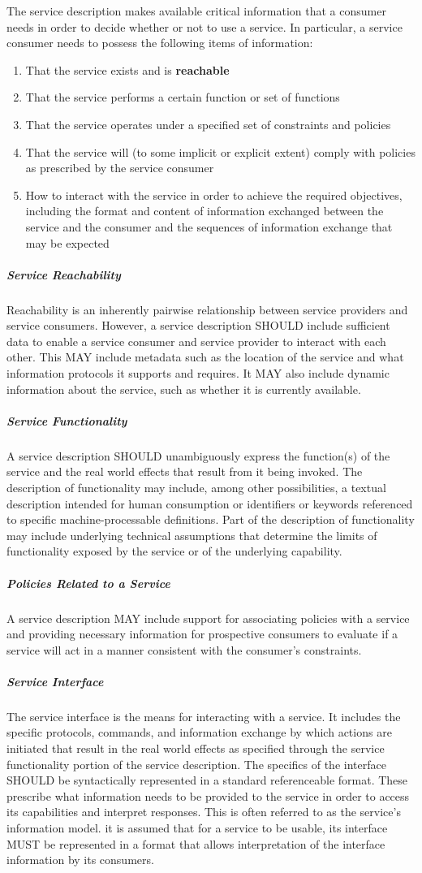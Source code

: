 \documentclass[10pt,a4paper]{article}
\begin{document}
The service description makes available critical information that a consumer needs in order to decide whether or not to use a service. In particular, a service consumer needs to possess the following items of information:
\begin{enumerate}
	\item That the service exists and is \textbf{reachable}
	\item That the service performs a certain function or set of functions
	\item That the service operates under a specified set of constraints and policies
	\item That the service will (to some implicit or explicit extent) comply with policies as prescribed by the service consumer
	\item How to interact with the service in order to achieve the required objectives, including the format and content of information exchanged between the service and the consumer and the sequences of information exchange that may be expected
\end{enumerate}
\subparagraph{Service Reachability}
Reachability is an inherently pairwise relationship between service providers and service consumers. However, a service description SHOULD include sufficient data to enable a service consumer and service provider to interact with each other. This MAY include metadata such as the location of the service and what information protocols it supports and requires. It MAY also include dynamic information about the service, such as whether it is currently available.
\subparagraph{Service Functionality}
A service description SHOULD unambiguously express the function(s) of the service and the real world effects that result from it being invoked. The description of functionality may include, among other possibilities, a textual description intended for human consumption or identifiers or keywords referenced to specific machine-processable definitions. Part of the description of functionality may include underlying technical assumptions that determine the limits of functionality exposed by the service or of the underlying capability.
\subparagraph{Policies Related to a Service}
A service description MAY include support for associating policies with a service and providing necessary information for prospective consumers to evaluate if a service will act in a manner consistent with the consumer’s constraints.
\subparagraph{Service Interface}
The service interface is the means for interacting with a service. It includes the specific protocols, commands, and information exchange by which actions are initiated that result in the real world effects as specified through the service functionality portion of the service description. The specifics of the interface SHOULD be syntactically represented in a standard referenceable format. These prescribe what information needs to be provided to the service in order to access its capabilities and interpret responses. This is often referred to as the service’s information model. it is assumed that for a service to be usable, its interface MUST be represented in a format that allows interpretation of the interface information by its consumers.
\end{document}
